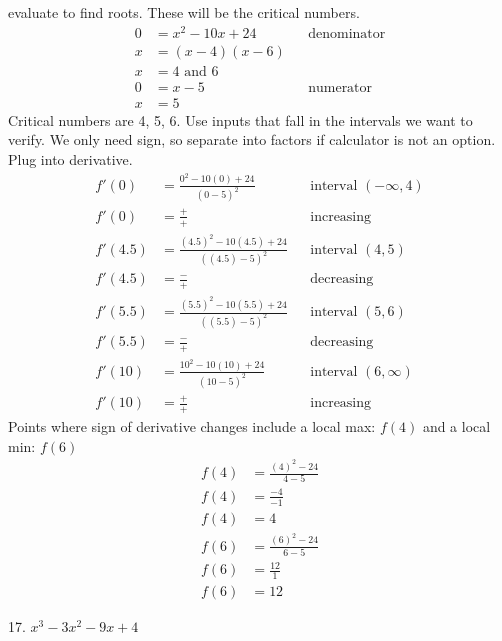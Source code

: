 \documentclass{article}
\begin{document}
\begin{description}
\begin{description}
                evaluate to find roots. These will be the critical numbers.
                \begin{align*}
                  0 & = x^2 - 10x + 24   &  & \text{denominator} \\
                  x & = (x - 4)(x - 6)                           \\
                  x & = 4 \text{ and } 6                         \\[2em]
                  0 & = x - 5            &  & \text{numerator}   \\
                  x & = 5
                \end{align*}
                Critical numbers are 4, 5, 6. Use inputs that fall in the intervals we want to verify. We only need
                sign, so separate into factors if calculator is not an option.
                Plug into derivative.
                \begin{align*}
                  f'(0)   & = \frac{0^2 - 10(0) + 24}{(0 - 5)^2}           &  & \text{interval $(-\infty, 4)$} \\
                  f'(0)   & = \frac{+}{+}                                  &  & \text{increasing}              \\[2em]
                  f'(4.5) & = \frac{(4.5)^2 - 10(4.5) + 24}{((4.5) - 5)^2} &  & \text{interval $(4, 5)$}       \\
                  f'(4.5) & = \frac{-}{+}                                  &  & \text{decreasing}              \\[2em]
                  f'(5.5) & = \frac{(5.5)^2 - 10(5.5) + 24}{((5.5) - 5)^2} &  & \text{interval $(5, 6)$}       \\
                  f'(5.5) & = \frac{-}{+}                                  &  & \text{decreasing}              \\[2em]
                  f'(10)  & = \frac{10^2 - 10(10) + 24}{(10 - 5)^2}        &  & \text{interval $(6, \infty)$}  \\
                  f'(10)  & = \frac{+}{+}                                  &  & \text{increasing}
                \end{align*}
                Points where sign of derivative changes include a local max: $f(4)$ \space and a local min: $f(6)$
                \begin{align*}
                  f(4) & = \frac{(4)^2-24}{4 - 5} \\
                  f(4) & = \frac{-4}{-1}          \\
                  f(4) & = 4                      \\[2 em]
                  f(6) & = \frac{(6)^2-24}{6 - 5} \\
                  f(6) & = \frac{12}{1}           \\
                  f(6) & = 12
                \end{align*}
          \item 17. $x^3-3x^2 - 9x + 4$


\end{description}
\end{description}
\end{document}
